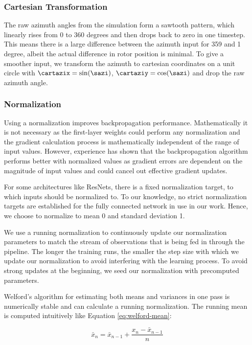 \subsubsection{Cartesian Transformation}

The raw azimuth angles from the simulation form a sawtooth pattern, which linearly rises from 0 to 360 degrees and then drops back to zero in one timestep. This means there is a large difference between the azimuth input for 359 and 1 degree, albeit the actual difference in rotor position is minimal. To give a smoother input, we transform the azimuth to cartesian coordinates on a unit circle with $\cartazix = \sin(\sazi)$, $\cartaziy = \cos(\sazi)$ and drop the raw azimuth angle.

\subsubsection{Normalization}

Using a normalization improves backpropagation performance. Mathematically it is not necessary as the first-layer weights could perform any normalization and the gradient calculation process is mathematically independent of the range of input values. However, experience has shown that the backpropagation algorithm performs better with normalized values as gradient errors are dependent on the magnitude of input values and could cancel out effective gradient updates. 

For some architectures like ResNets, there is a fixed normalization target, to which inputs should be normalized to. To our knowledge, no strict normalization targets are established for the fully connected network in use in our work. Hence, we choose to normalize to mean 0 and standard deviation 1.

We use a running normalization to continuously update our normalization parameters to match the stream of observations that is being fed in through the pipeline. The longer the training runs, the smaller the step size with which we update our normalization to avoid interfering with the learning process. To avoid strong updates at the beginning, we seed our normalization with precomputed parameters.

Welford's algorithm \cite{welfordNoteMethodCalculating1962} for estimating both means and variances in one pass is numerically stable and can calculate a running normalization. The running mean is computed intuitively like Equation \ref{eq:welford-mean}:

\begin{equation}
  \bar{x}_n = \bar{x}_{n-1} + \frac{x_n - \bar{x}_{n-1}}{n}
  \label{eq:welford-mean}
\end{equation}

